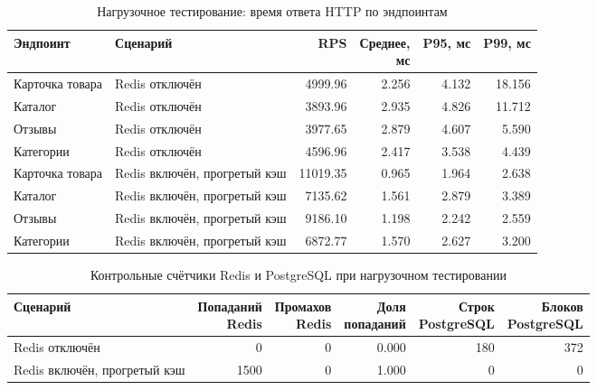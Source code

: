 \begin{table}[H]
\centering
\small
\caption{Нагрузочное тестирование: время ответа HTTP по эндпоинтам}
\label{tbl:research_http}
\begin{tabular}{|p{}|p{}|r|r|r|r|}
\hline
Эндпоинт & Сценарий & RPS & \makecell{Среднее,\\мс} & P95, мс & P99, мс \\ \hline
Карточка товара & Redis отключён & 4999.96 & 2.256 & 4.132 & 18.156 \\ \hline
Каталог & Redis отключён & 3893.96 & 2.935 & 4.826 & 11.712 \\ \hline
Отзывы & Redis отключён & 3977.65 & 2.879 & 4.607 & 5.590 \\ \hline
Категории & Redis отключён & 4596.96 & 2.417 & 3.538 & 4.439 \\ \hline
Карточка товара & Redis включён, прогретый кэш & 11019.35 & 0.965 & 1.964 & 2.638 \\ \hline
Каталог & Redis включён, прогретый кэш & 7135.62 & 1.561 & 2.879 & 3.389 \\ \hline
Отзывы & Redis включён, прогретый кэш & 9186.10 & 1.198 & 2.242 & 2.559 \\ \hline
Категории & Redis включён, прогретый кэш & 6872.77 & 1.570 & 2.627 & 3.200 \\ \hline
\end{tabular}
\end{table}

\begin{table}[H]
\centering
\small
\caption{Контрольные счётчики Redis и PostgreSQL при нагрузочном тестировании}
\label{tbl:research_cache_meta}
\begin{tabular}{|p{}|r|r|r|r|r|}
\hline
Сценарий & \makecell{Попаданий\\Redis} & \makecell{Промахов\\Redis} & \makecell{Доля\\попаданий} & \makecell{Строк\\PostgreSQL} & \makecell{Блоков\\PostgreSQL} \\ \hline
Redis отключён & 0 & 0 & 0.000 & 180 & 372 \\ \hline
Redis включён, прогретый кэш & 1500 & 0 & 1.000 & 0 & 0 \\ \hline
\end{tabular}
\end{table}

